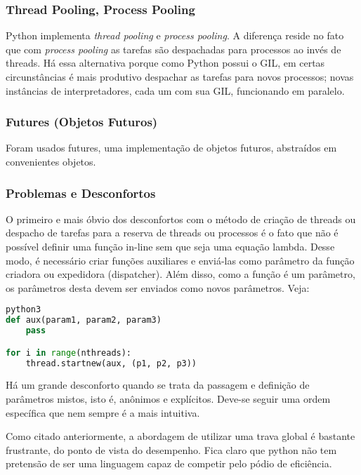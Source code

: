 \documentclass[12pt,a4paper]{article}
\begin{document}
\subsubsection{Thread Pooling, Process Pooling}
\label{sssec:python thread pooling}

Python implementa \emph{thread pooling} e \emph{process pooling}. A diferença reside no fato que com \emph{process pooling} as tarefas são despachadas para processos ao invés de threads. Há essa alternativa porque como Python possui o GIL, em certas circunstâncias é mais produtivo despachar as tarefas para novos processos; novas instâncias de interpretadores, cada um com sua GIL, funcionando em paralelo.

\subsubsection{Futures (Objetos Futuros)}
\label{sssec:python futures}

Foram usados futures, uma implementação de objetos futuros, abstraídos em convenientes objetos.

\subsubsection{Problemas e Desconfortos}
\label{sssec:python problemas}

O primeiro e mais óbvio dos desconfortos com o método de criação de threads ou despacho de tarefas para a reserva de threads ou processos é o fato que não é possível definir uma função in-line sem que seja uma equação lambda. Desse modo, é necessário criar funções auxiliares e enviá-las como parâmetro da função criadora ou expedidora (dispatcher). Além disso, como a função é um parâmetro, os parâmetros desta devem ser enviados como novos parâmetros. Veja:

\begin{lstlisting}[language=Python]
python3
def aux(param1, param2, param3)
    pass

for i in range(nthreads):
    thread.startnew(aux, (p1, p2, p3))
\end{lstlisting}

Há um grande desconforto quando se trata da passagem e definição de parâmetros mistos, isto é, anônimos e explícitos. Deve-se seguir uma ordem específica que nem sempre é a mais intuitiva.

Como citado anteriormente, a abordagem de utilizar uma trava global é bastante frustrante, do ponto de vista do desempenho. Fica claro que python não tem pretensão de ser uma linguagem capaz de competir pelo pódio de eficiência.
\end{document}
